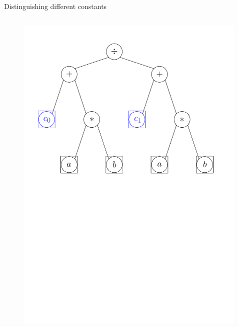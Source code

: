 \documentclass[xcolor=dvipsnames]{beamer}
\begin{document}
\begin{frame}[fragile]{Distinguishing different constants}
  \begin{columns}[T] %
    \begin{column}{0.75\textwidth}
      \begin{figure}[H]
        \centering
        \includegraphics[width=0.99\textwidth]{fig_exprtree_cb}
      \end{figure}
    \end{column}%
  \end{columns}
\end{frame}
\end{document}

